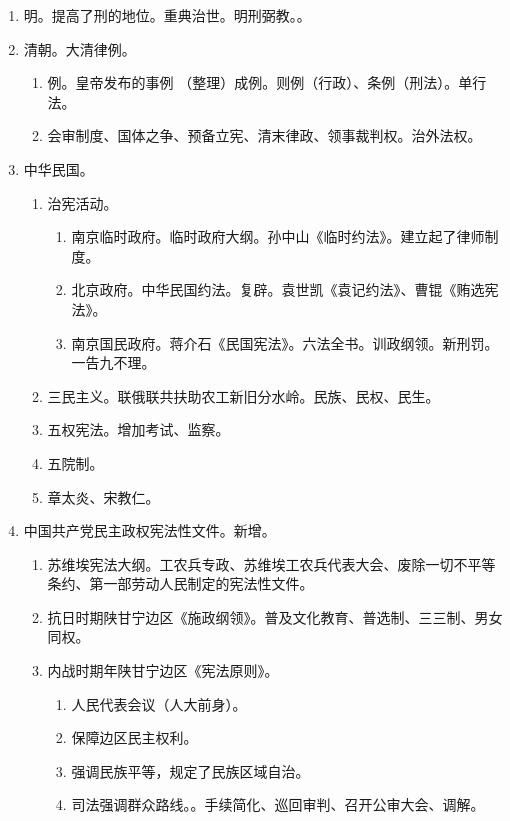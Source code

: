 \begin{enumerate}
\begin{enumerate}
\begin{enumerate}
                  \item 诸子均分。
                \end{enumerate}
          \item 翻异别堪。翻供换人。
        \end{enumerate}
  \item 明。提高了刑的地位。重典治世。明刑弼教。。
  \item 清朝。大清律例。
        \begin{enumerate}
          \item 例。皇帝发布的事例 \yjt（整理）成例。则例（行政）、条例（刑法）。单行法。
          \item 会审制度、国体之争、预备立宪、清末律政、领事裁判权。治外法权。
        \end{enumerate}
  \item 中华民国。
        \begin{enumerate}
          \item 治宪活动。
                \begin{enumerate}
                  \item 南京临时政府。临时政府大纲。孙中山《临时约法》。建立起了律师制度。
                  \item 北京政府。中华民国约法。复辟。袁世凯《袁记约法》、曹锟《贿选宪法》。
                  \item 南京国民政府。蒋介石《民国宪法》。六法全书。训政纲领。新刑罚。一告九不理。
                \end{enumerate}
          \item 三民主义。联俄联共扶助农工新旧分水岭。民族、民权、民生。
          \item 五权宪法。增加考试、监察。
          \item 五院制。
          \item 章太炎、宋教仁。
        \end{enumerate}
  \item 中国共产党民主政权宪法性文件。新增。
        \begin{enumerate}
          \item 苏维埃宪法大纲。工农兵专政、苏维埃工农兵代表大会、废除一切不平等条约、第一部劳动人民制定的宪法性文件。
          \item 抗日时期陕甘宁边区《施政纲领》。普及文化教育、普选制、三三制、男女同权。
          \item 内战时期年陕甘宁边区《宪法原则》。
                \begin{enumerate}
                  \item 人民代表会议（人大前身）。
                  \item 保障边区民主权利。
                  \item 强调民族平等，规定了民族区域自治。
                  \item 司法强调群众路线。。手续简化、巡回审判、召开公审大会、调解。
                \end{enumerate}
        \end{enumerate}
\end{enumerate}
